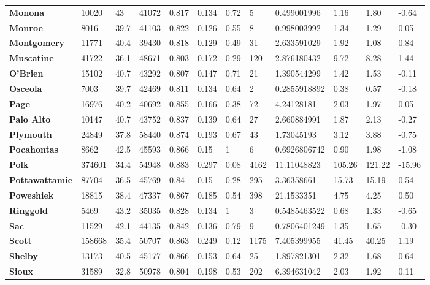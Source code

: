\documentclass[11pt]{article}
\begin{document}
\begin{table}[H]
\begin{tabular}{llllllllllll}
\textbf{Monona} & 10020 & 43 & 41072 & 0.817 & 0.134 & 0.72 & 5 & 0.499001996 & 1.16 & 1.80 & -0.64 \\
\textbf{Monroe} & 8016 & 39.7 & 41103 & 0.822 & 0.126 & 0.55 & 8 & 0.998003992 & 1.34 & 1.29 & 0.05 \\
\textbf{Montgomery} & 11771 & 40.4 & 39430 & 0.818 & 0.129 & 0.49 & 31 & 2.633591029 & 1.92 & 1.08 & 0.84 \\
\textbf{Muscatine} & 41722 & 36.1 & 48671 & 0.803 & 0.172 & 0.29 & 120 & 2.876180432 & 9.72 & 8.28 & 1.44 \\
\textbf{O'Brien} & 15102 & 40.7 & 43292 & 0.807 & 0.147 & 0.71 & 21 & 1.390544299 & 1.42 & 1.53 & -0.11 \\
\textbf{Osceola} & 7003 & 39.7 & 42469 & 0.811 & 0.134 & 0.64 & 2 & 0.2855918892 & 0.38 & 0.57 & -0.18 \\
\textbf{Page} & 16976 & 40.2 & 40692 & 0.855 & 0.166 & 0.38 & 72 & 4.24128181 & 2.03 & 1.97 & 0.05 \\
\textbf{Palo Alto} & 10147 & 40.7 & 43752 & 0.837 & 0.139 & 0.64 & 27 & 2.660884991 & 1.87 & 2.13 & -0.27 \\
\textbf{Plymouth} & 24849 & 37.8 & 58440 & 0.874 & 0.193 & 0.67 & 43 & 1.73045193 & 3.12 & 3.88 & -0.75 \\
\textbf{Pocahontas} & 8662 & 42.5 & 45593 & 0.866 & 0.15 & 1 & 6 & 0.6926806742 & 0.90 & 1.98 & -1.08 \\
\textbf{Polk} & 374601 & 34.4 & 54948 & 0.883 & 0.297 & 0.08 & 4162 & 11.11048823 & 105.26 & 121.22 & -15.96 \\
\textbf{Pottawattamie} & 87704 & 36.5 & 45769 & 0.84 & 0.15 & 0.28 & 295 & 3.36358661 & 15.73 & 15.19 & 0.54 \\
\textbf{Poweshiek} & 18815 & 38.4 & 47337 & 0.867 & 0.185 & 0.54 & 398 & 21.1533351 & 4.75 & 4.25 & 0.50 \\
\textbf{Ringgold} & 5469 & 43.2 & 35035 & 0.828 & 0.134 & 1 & 3 & 0.5485463522 & 0.68 & 1.33 & -0.65 \\
\textbf{Sac} & 11529 & 42.1 & 44135 & 0.842 & 0.136 & 0.79 & 9 & 0.7806401249 & 1.35 & 1.65 & -0.30 \\
\textbf{Scott} & 158668 & 35.4 & 50707 & 0.863 & 0.249 & 0.12 & 1175 & 7.405399955 & 41.45 & 40.25 & 1.19 \\
\textbf{Shelby} & 13173 & 40.5 & 45177 & 0.866 & 0.153 & 0.64 & 25 & 1.897821301 & 2.32 & 1.68 & 0.64 \\
\textbf{Sioux} & 31589 & 32.8 & 50978 & 0.804 & 0.198 & 0.53 & 202 & 6.394631042 & 2.03 & 1.92 & 0.11 \\

\end{tabular}
\end{table}
\end{document}

